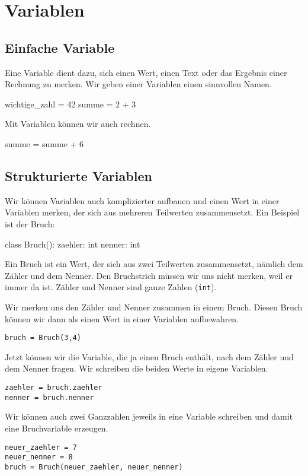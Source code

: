 \section{Variablen}

\subsection*{Einfache Variable}

Eine Variable dient dazu, sich einen Wert, einen Text oder das Ergebnis einer Rechnung zu merken. Wir geben einer Variablen einen sinnvollen Namen.

\begin{codePython}
wichtige_zahl = 42
summe = 2 + 3
\end{codePython}

Mit Variablen können wir auch rechnen.

\begin{codePython}
summe = summe + 6
\end{codePython}

\subsection*{Strukturierte Variablen}

Wir können Variablen auch komplizierter aufbauen und einen Wert in einer Variablen merken, der sich aus mehreren Teilwerten zusammensetzt. Ein Beispiel ist der Bruch:

\begin{codePython}
class Bruch():
	zaehler: int
	nenner: int
\end{codePython}

Ein Bruch ist ein Wert, der sich aus zwei Teilwerten zusammensetzt, nämlich dem Zähler und dem Nenner. Den Bruchstrich müssen wir uns nicht merken, weil er immer da ist. Zähler und Nenner sind ganze Zahlen (\texttt{int}).

Wir merken uns den Zähler und Nenner zusammen in einem Bruch. Diesen Bruch können wir dann als einen Wert in einer Variablen aufbewahren.

\lstset{style=syntaxPython}
\begin{lstlisting}
bruch = Bruch(3,4)
\end{lstlisting}

Jetzt können wir die Variable, die ja einen Bruch enthält, nach dem Zähler und dem Nenner fragen. Wir schreiben die beiden Werte in eigene Variablen.

\begin{lstlisting}
zaehler = bruch.zaehler
nenner = bruch.nenner
\end{lstlisting}

Wir können auch zwei Ganzzahlen jeweils in eine Variable schreiben und damit eine Bruchvariable erzeugen.

\begin{lstlisting}
neuer_zaehler = 7
neuer_nenner = 8
bruch = Bruch(neuer_zaehler, neuer_nenner)
\end{lstlisting}